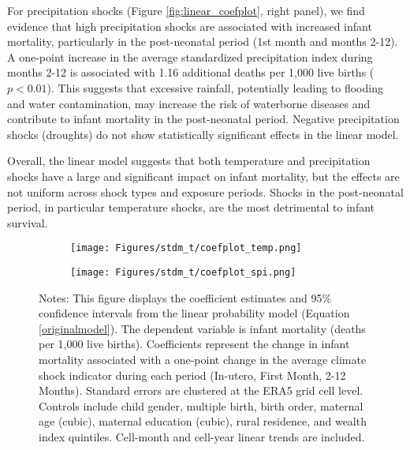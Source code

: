 \documentclass[a4paper]{article}
\begin{document}
For precipitation shocks (Figure \ref{fig:linear_coefplot}, right panel), we find evidence that high precipitation shocks are associated with increased infant mortality, particularly in the post-neonatal period (1st month and months 2-12).  A one-point increase in the average standardized precipitation index during months 2-12 is associated with 1.16 additional deaths per 1,000 live births ($p < 0.01$).  This suggests that excessive rainfall, potentially leading to flooding and water contamination, may increase the risk of waterborne diseases and contribute to infant mortality in the post-neonatal period.  Negative precipitation shocks (droughts) do not show statistically significant effects in the linear model.

Overall, the linear model suggests that both temperature and precipitation shocks have a large and significant impact on infant mortality, but the effects are not uniform across shock types and exposure periods.  Shocks in the post-neonatal period, in particular temperature shocks, are the most detrimental to infant survival.

\begin{figure}[t]
    \caption{Estimated Impacts of Linear Climate Shocks on Infant Mortality}
    \label{fig:linear_coefplot}
    \begin{center}
    \begin{subfigure}[t]{0.49\textwidth}
        \centering
        \texttt{[image: Figures/stdm\_t/coefplot\_temp.png]}
    \end{subfigure}%
    \begin{subfigure}[t]{0.49\textwidth}
        \centering
        \texttt{[image: Figures/stdm\_t/coefplot\_spi.png]}
    \end{subfigure}
    \end{center}
    \footnotesize{Notes: This figure displays the coefficient estimates and 95\% confidence intervals from the linear probability model (Equation \ref{originalmodel}).  The dependent variable is infant mortality (deaths per 1,000 live births).  Coefficients represent the change in infant mortality associated with a one-point change in the average climate shock indicator during each period (In-utero, First Month, 2-12 Months).  Standard errors are clustered at the ERA5 grid cell level.  Controls include child gender, multiple birth, birth order, maternal age (cubic), maternal education (cubic), rural residence, and wealth index quintiles. Cell-month and cell-year linear trends are included.}

\end{figure}
\end{document}

